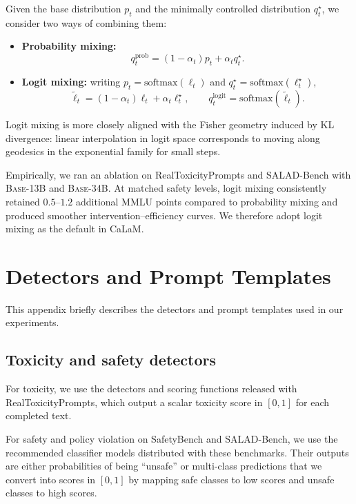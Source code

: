 \documentclass{article}
\theoremstyle{plain}
\theoremstyle{definition}
\theoremstyle{remark}
\begin{document}
Given the base distribution $p_t$ and the minimally controlled distribution $q_t^\star$, we consider two ways of combining them:

\begin{itemize}[leftmargin=1.5em]
  \item \textbf{Probability mixing:}
  \begin{equation}
    q_t^{\text{prob}}
    =
    (1-\alpha_t)p_t + \alpha_t q_t^\star.
  \end{equation}
  \item \textbf{Logit mixing:}
  writing $p_t = \mathrm{softmax}(\ell_t)$ and $q_t^\star = \mathrm{softmax}(\ell_t^\star)$,
  \begin{equation}
    \tilde{\ell}_t
    =
    (1-\alpha_t)\ell_t + \alpha_t \ell_t^\star,
    \qquad
    q_t^{\text{logit}} = \mathrm{softmax}(\tilde{\ell}_t).
  \end{equation}
\end{itemize}

Logit mixing is more closely aligned with the Fisher geometry induced by KL divergence: linear interpolation in logit space corresponds to moving along geodesics in the exponential family for small steps.

Empirically, we ran an ablation on RealToxicityPrompts and SALAD-Bench with \textsc{Base-13B} and \textsc{Base-34B}.
At matched safety levels, logit mixing consistently retained $0.5$--$1.2$ additional MMLU points compared to probability mixing and produced smoother intervention--efficiency curves.
We therefore adopt logit mixing as the default in CaLaM.

\section{Detectors and Prompt Templates}
\label{app:detectors}

This appendix briefly describes the detectors and prompt templates used in our experiments.

\subsection{Toxicity and safety detectors}

For toxicity, we use the detectors and scoring functions released with RealToxicityPrompts, which output a scalar toxicity score in $[0,1]$ for each completed text.

For safety and policy violation on SafetyBench and SALAD-Bench, we use the recommended classifier models distributed with these benchmarks.
Their outputs are either probabilities of being ``unsafe'' or multi-class predictions that we convert into scores in $[0,1]$ by mapping safe classes to low scores and unsafe classes to high scores.
\end{document}
